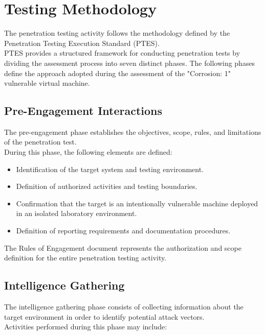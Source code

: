\section{Testing Methodology}

The penetration testing activity follows the methodology defined by the Penetration Testing Execution Standard (PTES). 
\\

PTES provides a structured framework for conducting penetration tests by dividing the
assessment process into seven distinct phases. The following phases define the
approach adopted during the assessment of the "Corrosion: 1" vulnerable
virtual machine.

\subsection{Pre-Engagement Interactions}

The pre-engagement phase establishes the objectives, scope, rules, and
limitations of the penetration test.
\\

During this phase, the following elements are defined:

\begin{itemize}
    \item Identification of the target system and testing environment.
    \item Definition of authorized activities and testing boundaries.
    \item Confirmation that the target is an intentionally vulnerable machine
    deployed in an isolated laboratory environment.
    \item Definition of reporting requirements and documentation procedures.
\end{itemize}

The Rules of Engagement document represents the authorization and scope
definition for the entire penetration testing activity.

\subsection{Intelligence Gathering}

The intelligence gathering phase consists of collecting information about the
target environment in order to identify potential attack vectors.
\\

Activities performed during this phase may include:


